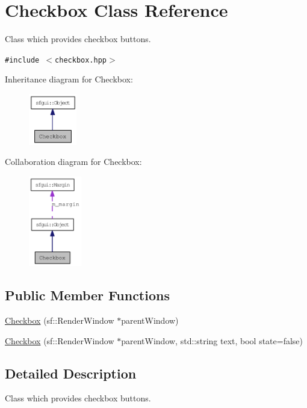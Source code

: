 \hypertarget{classCheckbox}{
\section{Checkbox Class Reference}
\label{classCheckbox}
}
Class which provides checkbox buttons.  


{\tt \#include $<$checkbox.hpp$>$}

Inheritance diagram for Checkbox:\nopagebreak
\begin{figure}[H]
\begin{center}
\leavevmode
\includegraphics[width=59pt]{classCheckbox__inherit__graph}
\end{center}
\end{figure}
Collaboration diagram for Checkbox:\nopagebreak
\begin{figure}[H]
\begin{center}
\leavevmode
\includegraphics[width=65pt]{classCheckbox__coll__graph}
\end{center}
\end{figure}
\subsection*{Public Member Functions}
\begin{CompactItemize}
\item 
\hyperlink{classCheckbox_52fb2f9dc8a59b60743f7b6cdb829d53}{Checkbox} (sf::RenderWindow $\ast$parentWindow)
\item 
\hyperlink{classCheckbox_4fca8d4a179ac49675fcdde1354a433c}{Checkbox} (sf::RenderWindow $\ast$parentWindow, std::string text, bool state=false)
\end{CompactItemize}


\subsection{Detailed Description}
Class which provides checkbox buttons. 

